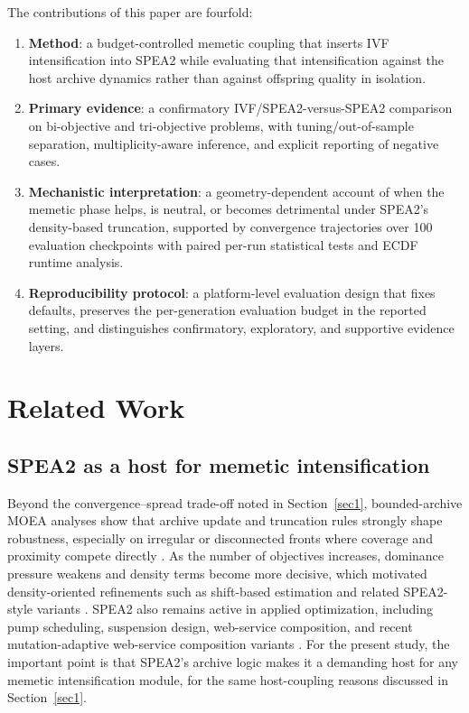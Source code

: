 \documentclass[pdflatex,sn-mathphys-ay]{sn-jnl}%
\theoremstyle{thmstyleone}%
\theoremstyle{thmstyletwo}%
\theoremstyle{thmstylethree}%
\begin{document}
The contributions of this paper are fourfold:
\begin{enumerate}
	\item \textbf{Method}: a budget-controlled memetic coupling that inserts IVF intensification into SPEA2 while evaluating that intensification against the host archive dynamics rather than against offspring quality in isolation.
	\item \textbf{Primary evidence}: a confirmatory IVF/SPEA2-versus-SPEA2 comparison on bi-objective and tri-objective problems, with tuning/out-of-sample separation, multiplicity-aware inference, and explicit reporting of negative cases.
	\item \textbf{Mechanistic interpretation}: a geometry-dependent account of when the memetic phase helps, is neutral, or becomes detrimental under SPEA2's density-based truncation, supported by convergence trajectories over 100 evaluation checkpoints with paired per-run statistical tests and ECDF runtime analysis.
	\item \textbf{Reproducibility protocol}: a platform-level evaluation design that fixes defaults, preserves the per-generation evaluation budget in the reported setting, and distinguishes confirmatory, exploratory, and supportive evidence layers.
\end{enumerate}

\section{Related Work}\label{sec:related}

\subsection{SPEA2 as a host for memetic intensification}\label{subsec:rw-spea2}
Beyond the convergence--spread trade-off noted in Section~\ref{sec1}, bounded-archive MOEA analyses show that archive update and truncation rules strongly shape robustness, especially on irregular or disconnected fronts where coverage and proximity compete directly \citep{knowles2003properties, bosman2003balance}. As the number of objectives increases, dominance pressure weakens and density terms become more decisive, which motivated density-oriented refinements such as shift-based estimation and related SPEA2-style variants \citep{li2014shift, li2015many}. SPEA2 also remains active in applied optimization, including pump scheduling, suspension design, web-service composition, and recent mutation-adaptive web-service composition variants \citep{Lopez2005, gadhvi2016suspension, Cremene2016, WangDu2024SPEA2}. For the present study, the important point is that SPEA2's archive logic makes it a demanding host for any memetic intensification module, for the same host-coupling reasons discussed in Section~\ref{sec1}.
\end{document}
